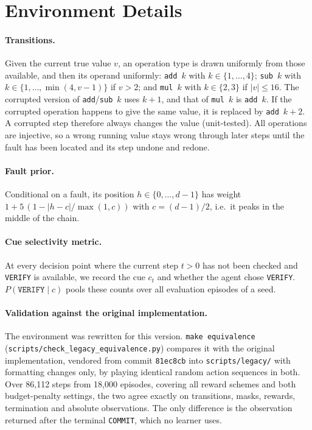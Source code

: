 \section{Environment Details}
\label{app:env}

\paragraph{Transitions.}
Given the current true value $v$, an operation type is drawn uniformly from those available, and then its operand uniformly: \texttt{add}~$k$ with $k \in \{1,\dots,4\}$; \texttt{sub}~$k$ with $k \in \{1,\dots,\min(4, v-1)\}$ if $v > 2$; and \texttt{mul}~$k$ with $k \in \{2,3\}$ if $|v| \le 16$. The corrupted version of \texttt{add}/\texttt{sub}~$k$ uses $k{+}1$, and that of \texttt{mul}~$k$ is \texttt{add}~$k$. If the corrupted operation happens to give the same value, it is replaced by \texttt{add}~$k{+}2$. A corrupted step therefore always changes the value (unit-tested). All operations are injective, so a wrong running value stays wrong through later steps until the fault has been located and its step undone and redone.

\paragraph{Fault prior.}
Conditional on a fault, its position $h \in \{0,\dots,d-1\}$ has weight $1 + 5\,(1 - |h - c| / \max(1, c))$ with $c = (d-1)/2$, i.e.\ it peaks in the middle of the chain.

\paragraph{Cue selectivity metric.}
At every decision point where the current step $t > 0$ has not been checked and \texttt{VERIFY} is available, we record the cue $c_t$ and whether the agent chose \texttt{VERIFY}. $P(\texttt{VERIFY} \mid c)$ pools these counts over all evaluation episodes of a seed.

\paragraph{Validation against the original implementation.}
The environment was rewritten for this version. \texttt{make equivalence} (\texttt{scripts/check\_legacy\_equivalence.py}) compares it with the original implementation, vendored from commit \texttt{81ec8cb} into \texttt{scripts/legacy/} with formatting changes only, by playing identical random action sequences in both. Over 86{,}112 steps from 18{,}000 episodes, covering all reward schemes and both budget-penalty settings, the two agree exactly on transitions, masks, rewards, termination and absolute observations. The only difference is the observation returned after the terminal \texttt{COMMIT}, which no learner uses.

